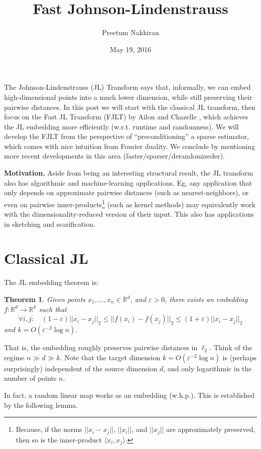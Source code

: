 \documentclass[]{article}
\title{Fast Johnson-Lindenstrauss}
\author{Preetum Nakkiran}
\date{May 19, 2016}
\newtheorem{theorem}{Theorem}
\newcommand{\1}{\mathbbm{1}}
\newcommand{\R}{\mathbb{R}}
\renewcommand{\epsilon}{\varepsilon}
\newcommand{\innp}[1]{\langle #1 \rangle}
\begin{document}
\maketitle

The Johnson-Lindenstrauss (JL) Transform says that, informally,
we can embed high-dimensional points into a much lower dimension, while still
preserving their pairwise distances.
In this post we will start with the classical JL transform,
then focus on the Fast JL Transform (FJLT) by Ailon and Chazelle \cite{fjlt},
which achieves the JL embedding more
efficiently (w.r.t. runtime and randomness).
We will develop the FJLT from the perspective of ``preconditioning'' a sparse
estimator, which comes with nice intuition from Fourier duality.
We conclude by mentioning more recent developments in this area
(faster/sparser/derandomizeder).

{\bf Motivation.}
Aside from being an interesting structural result, the JL transform also has
algorithmic and machine-learning applications. Eg, any application that only
depends on approximate pairwise distances (such as nearest-neighbors), or even on pairwise
inner-products\footnote{Because, if the norms $||x_i-x_j||$, $||x_i||$, and $||x_j||$ are
    approximately preserved, then so is the inner-product $\innp{x_i,x_j}$.
}
(such as kernel methods) may equivalently work with the
dimensionality-reduced version of their input.
This also has applications in sketching and scarification.

\section{Classical JL}
The JL embedding theorem is:

\begin{theorem}
Given points $x_1, \dots, x_n \in \R^d$, and $\epsilon > 0$, there exists an embedding $f: \R^d \to
\R^k$ such that
$$\forall i, j: \quad
(1-\epsilon) ||x_i - x_j||_2
\leq
||f(x_i) - f(x_j)||_2
\leq
(1+\epsilon) ||x_i - x_j||_2
$$
and $k = O(\epsilon^{-2}\log n)$.
\end{theorem}
That is, the embedding roughly preserves pairwise distances in $\ell_2$.
Think of the regime $n \gg d \gg k$.
Note that the target dimension $k = O(\epsilon^{-2}\log n)$
is (perhaps surprisingly) independent of the source dimension $d$, and only
logarithmic in the number of points $n$.


In fact, a random linear map works as an embedding (w.h.p.).
This is established by the following lemma.
\end{document}
